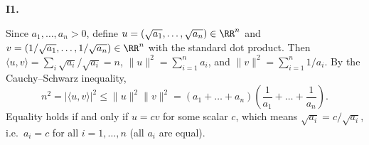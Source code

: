 \documentclass[10pt]{scrartcl}
\newcommand{\ip}[2]{\langle #1,#2\rangle}
\begin{document}
\begin{prob}
\textbf{I1. }\par 
{}
Since $a_1,\dots,a_n>0$, define $u=(\sqrt{a_1},\dots,\sqrt{a_n})\in\RR^n$ and $v=(1/\sqrt{a_1},\dots,1/\sqrt{a_n})\in\RR^n$ with the standard dot product. Then $\ip uv=\sum_i\sqrt{a_i}/\sqrt{a_i}=n$, $\|u\|^2=\sum_{i=1}^n a_i$, and $\|v\|^2=\sum_{i=1}^n 1/a_i$. By the Cauchy--Schwarz inequality,
\[
  n^2 = |\ip uv|^2 \le \|u\|^2\|v\|^2 = (a_1+\dots+a_n)\left(\frac{1}{a_1}+\dots+\frac{1}{a_n}\right).
\]
Equality holds if and only if $u=cv$ for some scalar $c$, which means $\sqrt{a_i}=c/\sqrt{a_i}$, i.e.\ $a_i=c$ for all $i=1,\dots,n$ (all $a_i$ are equal).
\end{prob}
\end{document}

